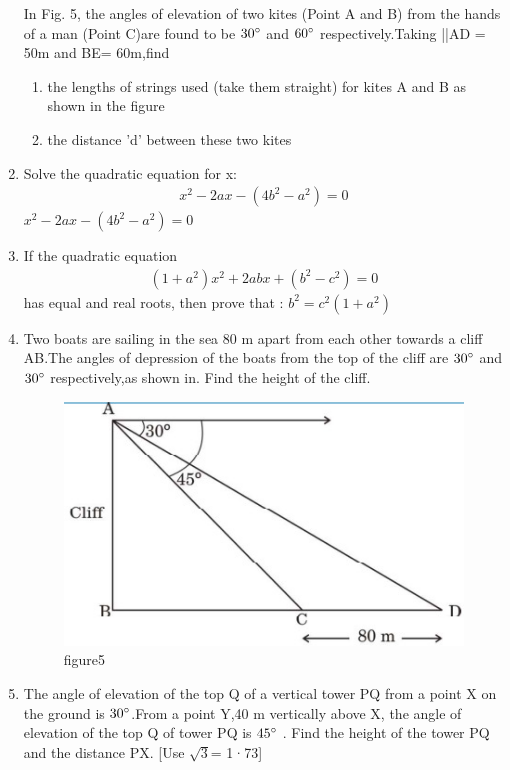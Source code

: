 \documentclass{article}
\begin{document}
\begin{enumerate}
In Fig. 5, the angles of elevation of two kites (Point A and B) from the hands of a man (Point C)are found to be $30\degree$ and $60\degree$ respectively.Taking ||AD = 50m and BE= 60m,find
\begin{enumerate}
    \item the lengths of strings used (take them straight) for kites A and B as shown in the figure
    \item the distance 'd' between these two kites
    \end{enumerate}
    \item Solve the quadratic equation for x:
    \begin{align}
    x^2-2ax-(4b^2-a^2)=0
         \end{align}
    $x^2-2ax-(4b^2-a^2)=0$
    \item If the quadratic equation
    \begin{align}
        (1+a^2)x^2+2abx+(b^2-c^2)=0
    \end{align}has equal and real roots, then prove that : 
    $b^2=c^2(1+a^2)$
\item Two boats are sailing in the sea 80 m apart from each other towards a cliff AB.The angles of depression of the boats from the top of the cliff are $30\degree$ and $30\degree$ respectively,as shown in.
Find the height of the cliff.
\begin{figure} 
\includegraphics[width=1.1\columnwidth]{figs/boat.edit.png}
\caption{figure5}
\label{fig5}
\end{figure}
 \item The angle of elevation of the top Q of a vertical tower PQ from a point X on the ground is $30\degree$.From a point Y,40 m vertically above X, the angle of elevation of the top Q of tower PQ is $45\degree$ . Find the height of the tower PQ and the distance PX. [Use $\sqrt{3}$= 1·73] 

\end{enumerate}
\end{document}
